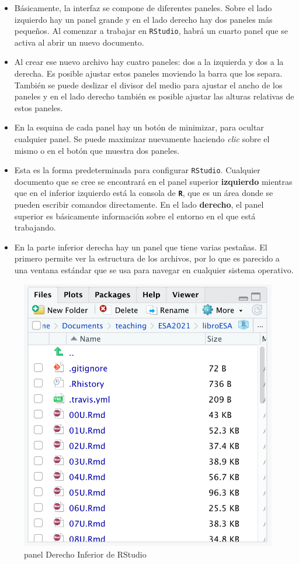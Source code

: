 \documentclass[
]{article}
\begin{document}
\begin{itemize}
\item
  Básicamente, la interfaz se compone de diferentes paneles. Sobre el lado izquierdo hay un panel grande y en el lado derecho hay dos paneles más pequeños. Al comenzar a trabajar en \texttt{RStudio}, habrá un cuarto panel que se activa al abrir un nuevo documento.
\item
  Al crear ese nuevo archivo hay cuatro paneles: dos a la izquierda y dos a la derecha. Es posible ajustar estos paneles moviendo la barra que los separa. También se puede deslizar el divisor del medio para ajustar el ancho de los paneles y en el lado derecho también es posible ajustar las alturas relativas de estos paneles.
\item
  En la esquina de cada panel hay un botón de minimizar, para ocultar cualquier panel. Se puede maximizar nuevamente haciendo \emph{clic} sobre el mismo o en el botón que muestra dos paneles.
\item
  Esta es la forma predeterminada para configurar \texttt{RStudio}. Cualquier documento que se cree se encontrará en el panel superior \textbf{izquierdo} mientras que en el inferior izquierdo está la consola de \textbf{\texttt{R}}, que es un área donde se pueden escribir comandos directamente. En el lado \textbf{derecho}, el panel superior es básicamente información sobre el entorno en el que está trabajando.
\item
  En la parte inferior derecha hay un panel que tiene varias pestañas. El primero permite ver la estructura de los archivos, por lo que es parecido a una ventana estándar que se usa para navegar en cualquier sistema operativo.
\end{itemize}

\begin{figure}

{\centering \includegraphics[width=0.6\linewidth]{imagenes/pan_der_inf} 

}

\caption{panel Derecho Inferior de RStudio}\label{fig:unnamed-chunk-140}
\end{figure}
\end{document}
